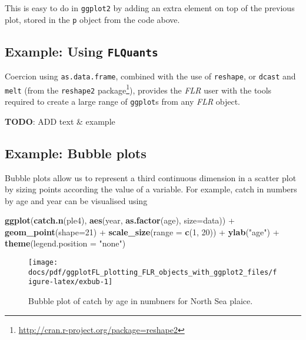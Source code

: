 \documentclass[]{article}
\newenvironment{Shaded}{\begin{snugshade}}{\end{snugshade}}
\newcommand{\KeywordTok}[1]{\textcolor[rgb]{0.13,0.29,0.53}{\textbf{{#1}}}}
\newcommand{\DataTypeTok}[1]{\textcolor[rgb]{0.13,0.29,0.53}{{#1}}}
\newcommand{\DecValTok}[1]{\textcolor[rgb]{0.00,0.00,0.81}{{#1}}}
\newcommand{\StringTok}[1]{\textcolor[rgb]{0.31,0.60,0.02}{{#1}}}
\newcommand{\NormalTok}[1]{{#1}}
\let\rmarkdownfootnote\footnote%
\def\footnote{\protect\rmarkdownfootnote}
\begin{document}
This is easy to do in \texttt{ggplot2} by adding an extra element on top
of the previous plot, stored in the \texttt{p} object from the code
above.

\subsection{\texorpdfstring{Example: Using
\texttt{FLQuants}}{Example: Using FLQuants}}\label{example-using-flquants}

Coercion using \texttt{as.data.frame}, combined with the use of
\texttt{reshape}, or \texttt{dcast} and \texttt{melt} (from the
\texttt{reshape2} package\footnote{\url{http://cran.r-project.org/package=reshape2}}),
provides the \emph{FLR} user with the tools required to create a large
range of \texttt{ggplot}s from any \emph{FLR} object.

\textbf{TODO}: ADD text \& example

\subsection{Example: Bubble plots}\label{example-bubble-plots}

Bubble plots allow us to represent a third continuous dimension in a
scatter plot by sizing points according the value of a variable. For
example, catch in numbers by age and year can be visualised using

\begin{Shaded}
\begin{Highlighting}[]
\KeywordTok{ggplot}\NormalTok{(}\KeywordTok{catch.n}\NormalTok{(ple4), }\KeywordTok{aes}\NormalTok{(year, }\KeywordTok{as.factor}\NormalTok{(age), }\DataTypeTok{size=}\NormalTok{data)) +}\StringTok{ }\KeywordTok{geom_point}\NormalTok{(}\DataTypeTok{shape=}\DecValTok{21}\NormalTok{) +}\StringTok{ }
\StringTok{  }\KeywordTok{scale_size}\NormalTok{(}\DataTypeTok{range =} \KeywordTok{c}\NormalTok{(}\DecValTok{1}\NormalTok{, }\DecValTok{20}\NormalTok{)) +}\StringTok{ }\KeywordTok{ylab}\NormalTok{(}\StringTok{"age"}\NormalTok{) +}\StringTok{ }\KeywordTok{theme}\NormalTok{(}\DataTypeTok{legend.position =} \StringTok{"none"}\NormalTok{)}
\end{Highlighting}
\end{Shaded}

\begin{figure}

{\centering \texttt{[image: docs/pdf/ggplotFL\_plotting\_FLR\_objects\_with\_ggplot2\_files/figure-latex/exbub-1]} 

}

\caption{Bubble plot of catch by age in numbners for North Sea plaice.}\label{fig:exbub}
\end{figure}
\end{document}

